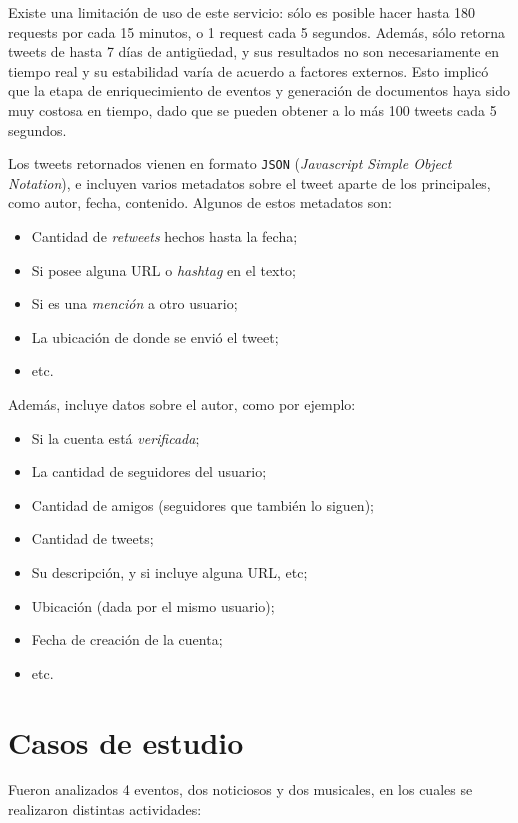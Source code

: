 \documentclass[upright, contnum]{umemoria}
\begin{document}
   Existe una limitación de uso de este servicio: sólo es posible hacer
   hasta 180 requests por cada 15 minutos, o 1 request cada 5
   segundos. Además, sólo retorna tweets de hasta 7 días de antigüedad, y
   sus resultados no son necesariamente en tiempo real y su estabilidad
   varía de acuerdo a factores externos. Esto implicó que la etapa de
   enriquecimiento de eventos y generación de documentos haya sido muy
   costosa en tiempo, dado que se pueden obtener a lo más 100 tweets
   cada 5 segundos.
   
   Los tweets retornados vienen en formato \texttt{JSON} (\emph{Javascript Simple Object Notation}),
   e incluyen varios metadatos sobre el tweet aparte de los principales,
   como autor, fecha, contenido. Algunos de estos metadatos son:
   
\begin{itemize}
\item Cantidad de \emph{retweets} hechos hasta la fecha;
\item Si posee alguna URL o \emph{hashtag} en el texto;
\item Si es una \emph{mención} a otro usuario;
\item La ubicación de donde se envió el tweet;
\item etc.
\end{itemize}
  Además, incluye datos sobre el autor, como por ejemplo:

\begin{itemize}
\item Si la cuenta está \emph{verificada};
\item La cantidad de seguidores del usuario;
\item Cantidad de amigos (seguidores que también lo siguen);
\item Cantidad de tweets;
\item Su descripción, y si incluye alguna URL, etc;
\item Ubicación (dada por el mismo usuario);
\item Fecha de creación de la cuenta;
\item etc.
\end{itemize}
\section{Casos de estudio}
\label{sec-4.4}

\label{casosest}

  Fueron analizados 4 eventos, dos noticiosos y dos musicales, en los
  cuales se realizaron distintas actividades:
\end{document}
